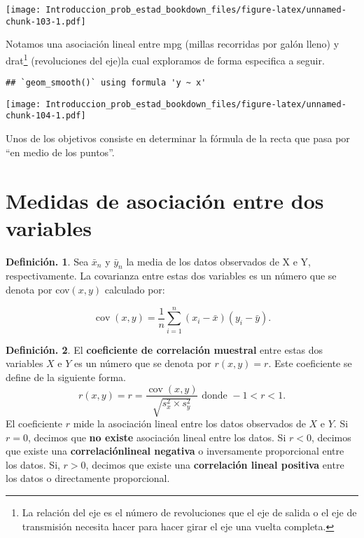 \documentclass[]{book}
\theoremstyle{definition}
\newtheorem{definition}{Definición.}[chapter]
\theoremstyle{definition}
\theoremstyle{definition}
\theoremstyle{remark}
\begin{document}
\texttt{[image: Introduccion\_prob\_estad\_bookdown\_files/figure-latex/unnamed-chunk-103-1.pdf]}

Notamos una asociación lineal entre mpg (millas
recorridas por galón lleno) y drat\footnote{La relación del eje
  es el número de revoluciones que el eje de salida o el
  eje de transmisión necesita hacer para hacer girar el
  eje una vuelta completa.} (revoluciones del eje)la
cual exploramos
de forma especifica a seguir.

\begin{verbatim}
## `geom_smooth()` using formula 'y ~ x'
\end{verbatim}

\texttt{[image: Introduccion\_prob\_estad\_bookdown\_files/figure-latex/unnamed-chunk-104-1.pdf]}

Unos de los objetivos consiste en determinar la
fórmula de la
recta que pasa por ``en medio de los puntos''.

\hypertarget{medidas-de-asociaciuxf3n-entre-dos-variables}{%
\section{Medidas de asociación entre dos variables}\label{medidas-de-asociaciuxf3n-entre-dos-variables}}

\begin{definition}
\protect\hypertarget{def:unnamed-chunk-105}{}{\label{def:unnamed-chunk-105} }Sea \(\bar{x}_n\) y \(\bar{y}_n\) la
media de los datos observados de X e Y,
respectivamente. La
covarianza entre estas dos variables es un
número que se denota por cov\((x,y)\) calculado por:

\[ \operatorname{cov}(x,y)=\frac{1}{n}\sum_{i=1}^
{n}\left(x_{i}-
 \bar{x}\right)\left(y_{i}-\bar{y}\right). \]
\end{definition}

\begin{definition}
\protect\hypertarget{def:unnamed-chunk-106}{}{\label{def:unnamed-chunk-106} }El \textbf{coeficiente de correlación muestral} entre
estas dos
variables \(X\) e \(Y\) es un número que se denota
por \(r(x, y)=r\).
Este
coeficiente se define de la siguiente forma.
\[r(x,y)= r =\frac{\operatorname{cov}(x,y)}{\sqrt
  { s_x^2  \times s_y^2}} \mbox{ donde
    } -1 < r < 1.\]
El coeficiente \(r\) mide la asociación lineal entre
los datos
observados de \(X\) e \(Y\).
Si \(r = 0\), decimos que \textbf{no existe} asociación
lineal entre
los datos. Si \(r<0\), decimos que existe una
\textbf{correlaciónlineal
negativa} o inversamente proporcional entre los
datos. Si, \(r > 0\), decimos que existe una \textbf{correlación lineal
positiva} entre
los datos o directamente proporcional.
\end{definition}
\end{document}

